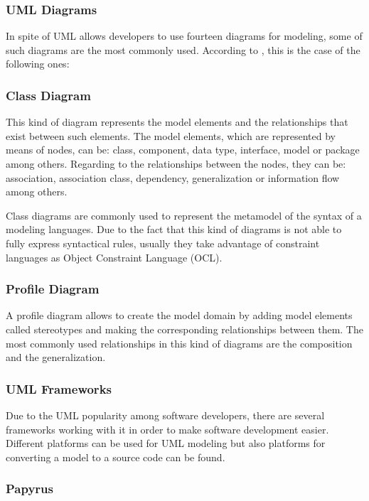 \subsubsection{UML Diagrams}

In spite of UML allows developers to use fourteen diagrams for modeling, some of such diagrams are the most commonly used. According to \cite{umlwebsite}, this is the case of the following ones:

\subsubsection*{Class Diagram}

This kind of diagram represents the model elements and the relationships that exist between such elements. The model elements, which are represented by means of nodes, can be: class, component, data type, interface, model or package among others. Regarding to the relationships between the nodes, they can be: association, association class, dependency, generalization or information flow among others.

Class diagrams are commonly used to represent the metamodel of the syntax of a modeling languages. Due to the fact that this kind of diagrams is not able to fully express syntactical rules, usually they take advantage of constraint languages as Object Constraint Language (OCL).

\subsubsection*{Profile Diagram}

A profile diagram allows to create the model domain by adding model elements called stereotypes and making the corresponding relationships between them. The most commonly used relationships in this kind of diagrams are the composition and the generalization.

\subsubsection{UML Frameworks}

Due to the UML popularity among software developers, there are several frameworks working with it in order to make software development easier. Different platforms can be used for UML modeling but also platforms for converting a model to a source code can be found.

\subsubsection*{Papyrus}

